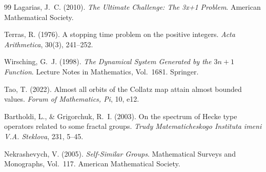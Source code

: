 \documentclass[11pt,reqno]{amsart}
\theoremstyle{definition}
\begin{document}
\begin{thebibliography}{99}
 Lagarias, J.~C. (2010). \textit{The Ultimate Challenge: The 3x+1 Problem}. American Mathematical Society.

 Terras, R. (1976). A stopping time problem on the positive integers. \textit{Acta Arithmetica}, 30(3), 241--252.

 Wirsching, G.~J. (1998). \textit{The Dynamical System Generated by the $3n+1$ Function}. Lecture Notes in Mathematics, Vol.~1681. Springer.

 Tao, T. (2022). Almost all orbits of the Collatz map attain almost bounded values. \textit{Forum of Mathematics, Pi}, 10, e12.

 Bartholdi, L., \& Grigorchuk, R.~I. (2003). On the spectrum of Hecke type operators related to some fractal groups. \textit{Trudy Matematicheskogo Instituta imeni V.A. Steklova}, 231, 5--45.

 Nekrashevych, V. (2005). \textit{Self-Similar Groups}. Mathematical Surveys and Monographs, Vol.~117. American Mathematical Society.
\end{thebibliography}
\end{document}
